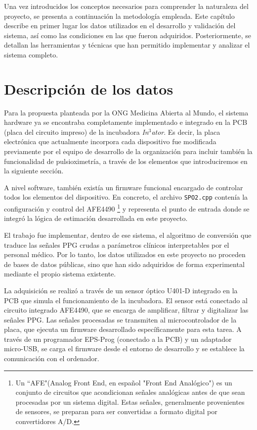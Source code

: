 \label{cap: Metodología}

Una vez introducidos los conceptos necesarios para comprender la naturaleza del proyecto, se presenta a continuación la metodología empleada. Este capítulo describe en primer lugar los datos utilizados en el desarrollo y validación del sistema, así como las condiciones en las que fueron adquiridos. Posteriormente, se detallan las herramientas y técnicas que han permitido implementar y analizar el sistema completo.


\section{Descripción de los datos}

Para la propuesta planteada por la ONG Medicina Abierta al Mundo, el sistema hardware ya se encontraba completamente implementado e integrado en la PCB (placa del circuito impreso) de la incubadora \textit{In$^3$ator}. Es decir, la placa electrónica que actualmente incorpora cada dispositivo fue modificada previamente por el equipo de desarrollo de la organización para incluir también la funcionalidad de pulsioximetría, a través de los elementos que introduciremos en la siguiente sección. 

A nivel software, también existía un firmware funcional encargado de controlar todos los elementos del dispositivo. En concreto, el archivo \texttt{SPO2.cpp} contenía la configuración y control del AFE4490 \footnote{Un ``AFE"(Analog Front End, en español "Front End Analógico") es un conjunto de circuitos que acondicionan señales analógicas antes de que sean procesadas por un sistema digital. Estas señales, generalmente provenientes de sensores, se preparan para ser convertidas a formato digital por convertidores A/D. } y representa el punto de entrada donde se integró la lógica de estimación desarrollada en este proyecto.


El trabajo fue implementar, dentro de ese sistema, el algoritmo de conversión que traduce las señales PPG crudas a parámetros clínicos interpretables por el personal médico. Por lo tanto, los datos utilizados en este proyecto no proceden de bases de datos públicas, sino que han sido adquiridos de forma experimental mediante el propio sistema existente. 

La adquisición se realizó a través de un sensor óptico U401-D integrado en la PCB que simula el funcionamiento de la incubadora. El sensor está conectado al circuito integrado AFE4490, que se encarga de amplificar, filtrar y digitalizar las señales PPG. Las señales procesadas se transmiten al microcontrolador de la placa, que ejecuta un firmware desarrollado específicamente para esta tarea. A través de un programador EPS-Prog (conectado a la PCB) y un adaptador micro-USB, se carga el firmware desde el entorno de desarrollo y se establece la comunicación con el ordenador.

